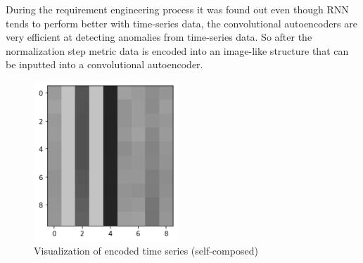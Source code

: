 During the requirement engineering process it was found out even though RNN tends to perform better with time-series data, the convolutional autoencoders are very efficient at detecting anomalies from time-series data. So after the normalization step metric data is encoded into an image-like structure that can be inputted into a convolutional autoencoder.

\begin{figure}[H]
    \includegraphics[height=6cm]{assets/implementation/visualize-representation.png}
    \caption{Visualization of encoded time series (self-composed)}
    \label{fig:visualize-representation}
\end{figure}